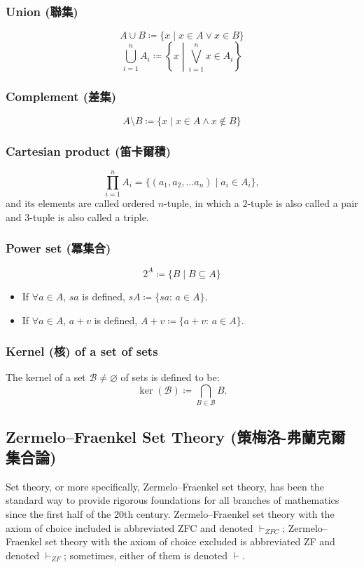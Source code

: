 \documentclass[a4paper,12pt]{report}
\begin{document}
\subsubsection{Union (聯集)}
\[A\cup B\coloneq\{x\mid x\in A \lor x\in B\}\]
\[\bigcup_{i=1}^n A_i\coloneq\left\{x\middle | \bigvee_{i=1}^n x\in A_i\right\}\]
\subsubsection{Complement (差集)}
\[A\setminus B\coloneq\{x\mid x\in A \land x\notin B\}\]
\subsubsection{Cartesian product (笛卡爾積)}
\[\prod_{i=1}^nA_i=\{(a_1,a_2,\ldots a_n)\mid a_i\in A_i\},\]
and its elements are called ordered $n$-tuple, in which a $2$-tuple is also called a pair and $3$-tuple is also called a triple.
\subsubsection{Power set (冪集合)}
\[2^A\coloneq\{B\mid B\subseteq A\}\]
\begin{itemize}
\item If $\forall a\in A$, $sa$ is defined, $sA\coloneq\{sa:\,a\in A\}$.
\item If $\forall a\in A$, $a+v$ is defined, $A+v\coloneq\{a+v:\,a\in A\}$.
\end{itemize}
\subsubsection{Kernel (核) of a set of sets}
The kernel of a set $\mathcal {B}\neq \varnothing$ of sets is defined to be:
\[\ker(\mathcal {B})\coloneq\bigcap_{B\in\mathcal {B}}B.\]
\subsection{Zermelo–Fraenkel Set Theory (策梅洛-弗蘭克爾集合論)}
Set theory, or more specifically, Zermelo–Fraenkel set theory, has been the standard way to provide rigorous foundations for all branches of mathematics since the first half of the 20th century. Zermelo–Fraenkel set theory with the axiom of choice included is abbreviated ZFC and denoted $\vdash_{ZFC}$; Zermelo–Fraenkel set theory with the axiom of choice excluded is abbreviated ZF and denoted $\vdash_{ZF}$; sometimes, either of them is denoted $\vdash$.
\end{document}
